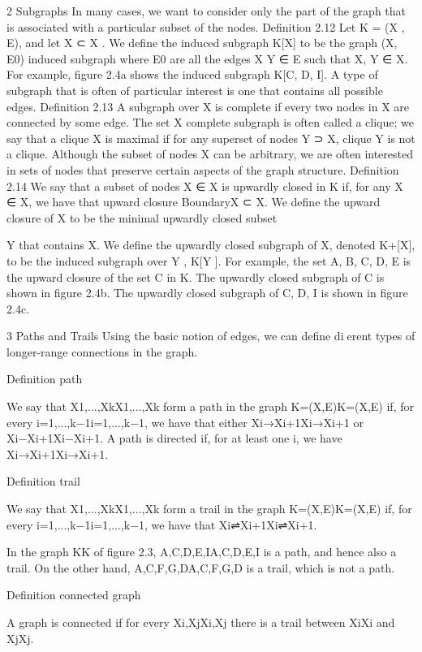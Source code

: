 2 Subgraphs
In many cases, we want to consider only the part of the graph that is associated with a particular subset of the nodes. Definition 2.12 Let K = (X , E), and let X ⊂ X . We define the induced subgraph K[X] to be the graph (X, E0) induced subgraph where E0 are all the edges X Y ∈ E such that X, Y ∈ X. For example, figure 2.4a shows the induced subgraph K[C, D, I]. A type of subgraph that is often of particular interest is one that contains all possible edges. Definition 2.13 A subgraph over X is complete if every two nodes in X are connected by some edge. The set X complete subgraph is often called a clique; we say that a clique X is maximal if for any superset of nodes Y ⊃ X, clique Y is not a clique. Although the subset of nodes X can be arbitrary, we are often interested in sets of nodes that preserve certain aspects of the graph structure. Definition 2.14 We say that a subset of nodes X ∈ X is upwardly closed in K if, for any X ∈ X, we have that upward closure BoundaryX ⊂ X. We define the upward closure of X to be the minimal upwardly closed subset

Y that contains X. We define the upwardly closed subgraph of X, denoted K+[X], to be the induced subgraph over Y , K[Y ]. For example, the set A, B, C, D, E is the upward closure of the set {C} in K. The upwardly closed subgraph of {C} is shown in figure 2.4b. The upwardly closed subgraph of {C, D, I} is shown in figure 2.4c.

3 Paths and Trails
Using the basic notion of edges, we can define dierent types of longer-range connections in the graph.

Definition path

We say that X1,...,XkX1,...,Xk form a path in the graph K=(X,E)K=(X,E) if, for every i=1,...,k−1i=1,...,k−1, we have that either Xi→Xi+1Xi→Xi+1 or Xi−Xi+1Xi−Xi+1. A path is directed if, for at least one i, we have Xi→Xi+1Xi→Xi+1.

Definition trail

We say that X1,...,XkX1,...,Xk form a trail in the graph K=(X,E)K=(X,E) if, for every i=1,...,k−1i=1,...,k−1, we have that Xi⇌Xi+1Xi⇌Xi+1.


In the graph KK of figure 2.3, A,C,D,E,IA,C,D,E,I is a path, and hence also a trail. On the other hand, A,C,F,G,DA,C,F,G,D is a trail, which is not a path.

Definition connected graph

A graph is connected if for every Xi,XjXi,Xj there is a trail between XiXi and XjXj.

